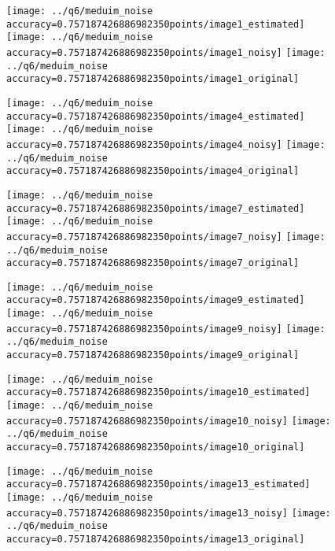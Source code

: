 \documentclass[a4paper,12pt]{article}
\begin{document}
\begin{figure}[!htb]
  \texttt{[image: ../q6/meduim\_noise accuracy=0.757187426886982350points/image1\_estimated]}
\endminipage\hfill
{}
  \texttt{[image: ../q6/meduim\_noise accuracy=0.757187426886982350points/image1\_noisy]}
\endminipage\hfill
{}
  \texttt{[image: ../q6/meduim\_noise accuracy=0.757187426886982350points/image1\_original]}
\endminipage\hfill

  \texttt{[image: ../q6/meduim\_noise accuracy=0.757187426886982350points/image4\_estimated]}
\endminipage\hfill
{}
  \texttt{[image: ../q6/meduim\_noise accuracy=0.757187426886982350points/image4\_noisy]}
\endminipage\hfill
{}
  \texttt{[image: ../q6/meduim\_noise accuracy=0.757187426886982350points/image4\_original]}
\endminipage\hfill

  \texttt{[image: ../q6/meduim\_noise accuracy=0.757187426886982350points/image7\_estimated]}
\endminipage\hfill
{}
  \texttt{[image: ../q6/meduim\_noise accuracy=0.757187426886982350points/image7\_noisy]}
\endminipage\hfill
{}
  \texttt{[image: ../q6/meduim\_noise accuracy=0.757187426886982350points/image7\_original]}
\endminipage\hfill

  \texttt{[image: ../q6/meduim\_noise accuracy=0.757187426886982350points/image9\_estimated]}
\endminipage\hfill
{}
  \texttt{[image: ../q6/meduim\_noise accuracy=0.757187426886982350points/image9\_noisy]}
\endminipage\hfill
{}
  \texttt{[image: ../q6/meduim\_noise accuracy=0.757187426886982350points/image9\_original]}
\endminipage\hfill

  \texttt{[image: ../q6/meduim\_noise accuracy=0.757187426886982350points/image10\_estimated]}
\endminipage\hfill
{}
  \texttt{[image: ../q6/meduim\_noise accuracy=0.757187426886982350points/image10\_noisy]}
\endminipage\hfill
{}
  \texttt{[image: ../q6/meduim\_noise accuracy=0.757187426886982350points/image10\_original]}
\endminipage\hfill

  \texttt{[image: ../q6/meduim\_noise accuracy=0.757187426886982350points/image13\_estimated]}
\endminipage\hfill
{}
  \texttt{[image: ../q6/meduim\_noise accuracy=0.757187426886982350points/image13\_noisy]}
\endminipage\hfill
{}
  \texttt{[image: ../q6/meduim\_noise accuracy=0.757187426886982350points/image13\_original]}
\endminipage\hfill


\end{figure}
\end{document}
